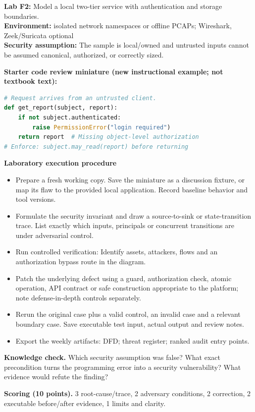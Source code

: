 \documentclass[10pt,letterpaper]{article}
\begin{document}
\begin{insight}\textbf{Lab F2:} Model a local two-tier service with authentication and storage boundaries.\\\textbf{Environment:} isolated network namespaces or offline PCAPs; Wireshark, Zeek/Suricata optional\\\textbf{Security assumption:} The sample is local/owned and untrusted inputs cannot be assumed canonical, authorized, or correctly sized.\end{insight}
\textbf{Starter code review miniature (new instructional example; not textbook text):}
\begin{lstlisting}[language=Python]
# Request arrives from an untrusted client.
def get_report(subject, report):
    if not subject.authenticated:
        raise PermissionError("login required")
    return report  # Missing object-level authorization
# Enforce: subject.may_read(report) before returning
\end{lstlisting}
\textbf{Laboratory execution procedure}
\begin{itemize}[leftmargin=*,itemsep=2pt]
\item Prepare a fresh working copy. Save the miniature as a discussion fixture, or map its flaw to the provided local application. Record baseline behavior and tool versions.
\item Formulate the security invariant and draw a source-to-sink or state-transition trace. List exactly which inputs, principals or concurrent transitions are under adversarial control.
\item Run controlled verification: Identify assets, attackers, flows and an authorization bypass route in the diagram.
\item Patch the underlying defect using a guard, authorization check, atomic operation, API contract or safe construction appropriate to the platform; note defense-in-depth controls separately.
\item Rerun the original case plus a valid control, an invalid case and a relevant boundary case. Save executable test input, actual output and review notes.
\item Export the weekly artifacts: DFD; threat register; ranked audit entry points.
\end{itemize}
\textbf{Knowledge check.} Which security assumption was false? What exact precondition turns the programming error into a security vulnerability? What evidence would refute the finding?

\textbf{Scoring (10 points).} 3 root-cause/trace, 2 adversary conditions, 2 correction, 2 executable before/after evidence, 1 limits and clarity.
\end{document}
